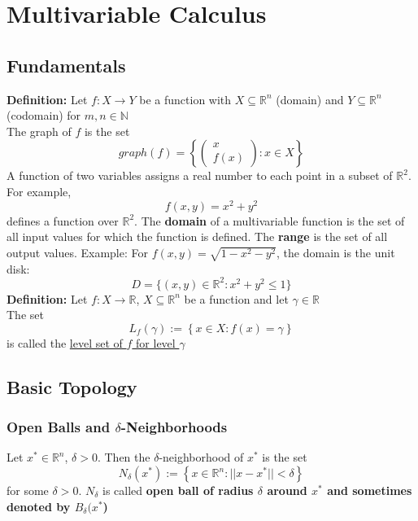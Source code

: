 \documentclass{article}
\begin{document}
\section{Multivariable Calculus}
\subsection{Fundamentals}
\textbf{Definition:} Let $f : X \rightarrow Y$ be a function with $ X \subseteq \mathbb{R}^{n} $ (domain) and $ Y \subseteq \mathbb{R}^{n} $ (codomain) for $m, n \in \mathbb{N}$ \\
The graph of $f$ is the set 
\begin{equation*} graph(f) = \left\{\begin{pmatrix} x \\ f(x)\end{pmatrix} :  x \in X \right\} \end{equation*}
A function of two variables assigns a real number to each point in a subset of $\mathbb{R}^2$. For example,
\[
f(x, y) = x^2 + y^2
\]
defines a function over $\mathbb{R}^2$.
The \textbf{domain} of a multivariable function is the set of all input values for which the function is defined. The \textbf{range} is the set of all output values.
Example: For $f(x, y) = \sqrt{1 - x^2 - y^2}$, the domain is the unit disk:
\[
D = \{(x, y) \in \mathbb{R}^2 : x^2 + y^2 \leq 1\}
\]
\textbf{Definition:} Let $f : X \rightarrow \mathbb{R}$, $ X \subseteq \mathbb{R}^{n} $ be a function and let $\gamma \in \mathbb{R}$ \\ 
The set 
\begin{equation*} L_{f} (\gamma) := \left\{x \in X : f(x) = \gamma \right\}\end{equation*} is called the \underline{level set of $f$ for level $\gamma$}
\newpage 
\subsection{Basic Topology}
\subsubsection{Open Balls and $\delta$-Neighborhoods}
Let $x^{*} \in \mathbb{R}^n$, $\delta > 0$. Then the $\delta$-neighborhood of $x^{*}$ is the set
\[
N_{\delta} (x^{*}) := \left\{x \in \mathbb{R}^{n}: ||x - x^{*}|| < \delta\right\}
\]
for some $\delta > 0$. $N_{\delta}$ is called \textbf{open ball of radius $\delta$ around $x^{*}$ and sometimes denoted by $B_{\delta}(x^{*}$)} 
\end{document}
